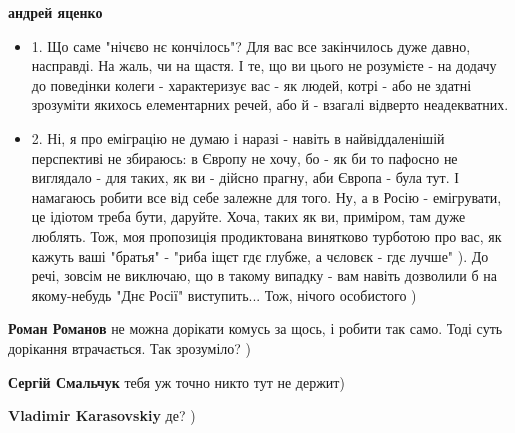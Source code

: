 \begin{itemize}
\begin{itemize}
\textbf{андрей яценко}

\begin{itemize}
\item 1. Що саме "нічєво нє кончілось"? Для вас все закінчилось дуже давно,
насправді. На жаль, чи на щастя. І те, що ви цього не розумієте - на додачу до
поведінки колеги - характеризує вас - як людей, котрі - або не здатні зрозуміти
якихось елементарних речей, або й - взагалі відверто неадекватних.

\item 2. Ні, я про еміграцію не думаю і наразі - навіть в найвіддаленішій перспективі
не збираюсь: в Європу не хочу, бо - як би то пафосно не виглядало - для таких,
як ви - дійсно прагну, аби Європа - була тут. І намагаюсь робити все від себе
залежне для того. Ну, а в Росію - емігрувати, це ідіотом треба бути, даруйте.
Хоча, таких як ви, приміром, там дуже люблять. Тож, моя пропозиція продиктована
винятково турботою про вас, як кажуть ваші "братья" - "риба іщєт гдє глубже, а
чєловєк - гдє лучше" ). До речі, зовсім не виключаю, що в такому випадку - вам
навіть дозволили б на якому-небудь "Днє Росії" виступить... Тож, нічого
особистого )
\end{itemize}

 
\textbf{Роман Романов} не можна дорікати комусь за щось, і робити так само. Тоді суть дорікання втрачається. Так зрозуміло? )

 
\textbf{Сергій Смальчук} тебя уж точно никто тут не держит)

 
\textbf{Vladimir Karasovskiy} де? )

 

\end{itemize}
\end{itemize}
